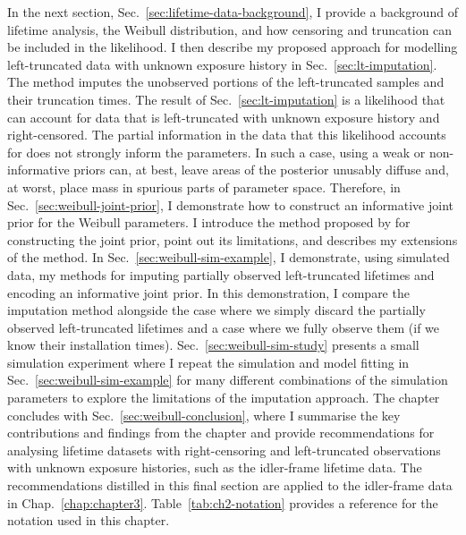 In the next section, Sec.~\ref{sec:lifetime-data-background}, I provide a background of lifetime analysis, the Weibull distribution, and how censoring and truncation can be included in the likelihood. I then describe my proposed approach for modelling left-truncated data with unknown exposure history in Sec.~\ref{sec:lt-imputation}. The method imputes the unobserved portions of the left-truncated samples and their truncation times. The result of Sec.~\ref{sec:lt-imputation} is a likelihood that can account for data that is left-truncated with unknown exposure history and right-censored. The partial information in the data that this likelihood accounts for does not strongly inform the parameters. In such a case, using a weak or non-informative priors can, at best, leave areas of the posterior unusably diffuse and, at worst, place mass in spurious parts of parameter space. Therefore, in Sec.~\ref{sec:weibull-joint-prior}, I demonstrate how to construct an informative joint prior for the Weibull parameters. I introduce the method proposed by \citet{kaminskiy2005} for constructing the joint prior, point out its limitations, and describes my extensions of the method. In Sec.~\ref{sec:weibull-sim-example}, I demonstrate, using simulated data, my methods for imputing partially observed left-truncated lifetimes and encoding an informative joint prior. In this demonstration, I compare the imputation method alongside the case where we simply discard the partially observed left-truncated lifetimes and a case where we fully observe them (if we know their installation times). Sec.~\ref{sec:weibull-sim-study} presents a small simulation experiment where I repeat the simulation and model fitting in Sec.~\ref{sec:weibull-sim-example} for many different combinations of the simulation parameters to explore the limitations of the imputation approach. The chapter concludes with Sec.~\ref{sec:weibull-conclusion}, where I summarise the key contributions and findings from the chapter and provide recommendations for analysing lifetime datasets with right-censoring and left-truncated observations with unknown exposure histories, such as the idler-frame lifetime data. The recommendations distilled in this final section are applied to the idler-frame data in Chap.~\ref{chap:chapter3}. Table~\ref{tab:ch2-notation} provides a reference for the notation used in this chapter.

